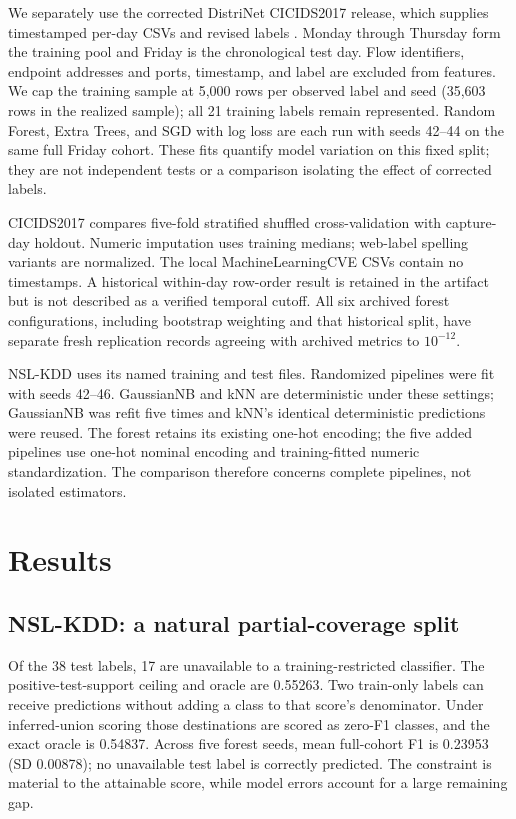 \documentclass[journal]{IEEEtran}
\begin{document}
We separately use the corrected DistriNet CICIDS2017 release, which supplies timestamped per-day CSVs and revised labels \cite{engelen2021,lanvin2023}. Monday through Thursday form the training pool and Friday is the chronological test day. Flow identifiers, endpoint addresses and ports, timestamp, and label are excluded from features. We cap the training sample at 5,000 rows per observed label and seed (35,603 rows in the realized sample); all 21 training labels remain represented. Random Forest, Extra Trees, and SGD with log loss are each run with seeds 42--44 on the same full Friday cohort. These fits quantify model variation on this fixed split; they are not independent tests or a comparison isolating the effect of corrected labels.

CICIDS2017 compares five-fold stratified shuffled cross-validation with capture-day holdout. Numeric imputation uses training medians; web-label spelling variants are normalized. The local MachineLearningCVE CSVs contain no timestamps. A historical within-day row-order result is retained in the artifact but is not described as a verified temporal cutoff. All six archived forest configurations, including bootstrap weighting and that historical split, have separate fresh replication records agreeing with archived metrics to \(10^{-12}\).

NSL-KDD uses its named training and test files. Randomized pipelines were fit with seeds 42--46. GaussianNB and kNN are deterministic under these settings; GaussianNB was refit five times and kNN's identical deterministic predictions were reused. The forest retains its existing one-hot encoding; the five added pipelines use one-hot nominal encoding and training-fitted numeric standardization. The comparison therefore concerns complete pipelines, not isolated estimators.

\section{Results}
\subsection{NSL-KDD: a natural partial-coverage split}
Of the 38 test labels, 17 are unavailable to a training-restricted classifier. The positive-test-support ceiling and oracle are 0.55263. Two train-only labels can receive predictions without adding a class to that score's denominator. Under inferred-union scoring those destinations are scored as zero-F1 classes, and the exact oracle is 0.54837. Across five forest seeds, mean full-cohort F1 is 0.23953 (SD 0.00878); no unavailable test label is correctly predicted. The constraint is material to the attainable score, while model errors account for a large remaining gap.
\end{document}
